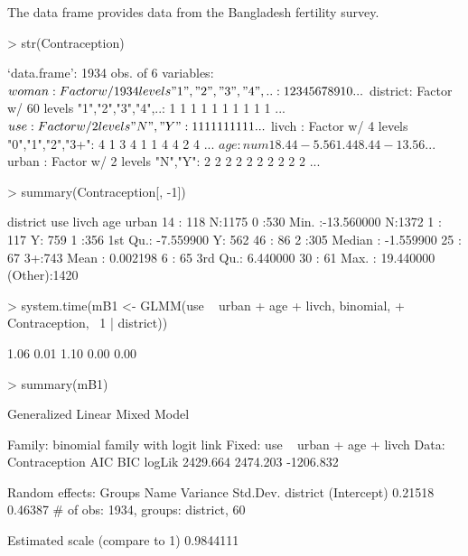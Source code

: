 \documentclass[12pt]{article}
\begin{document}
The data frame  provides data from the
Bangladesh fertility survey.
\begin{Schunk}
\begin{Sinput}
> str(Contraception)
\end{Sinput}
\begin{Soutput}
`data.frame':	1934 obs. of  6 variables:
 $ woman   : Factor w/ 1934 levels "1","2","3","4",..: 1 2 3 4 5 6 7 8 9 10 ...
 $ district: Factor w/ 60 levels "1","2","3","4",..: 1 1 1 1 1 1 1 1 1 1 ...
 $ use     : Factor w/ 2 levels "N","Y": 1 1 1 1 1 1 1 1 1 1 ...
 $ livch   : Factor w/ 4 levels "0","1","2","3+": 4 1 3 4 1 1 4 4 2 4 ...
 $ age     : num   18.44  -5.56   1.44   8.44 -13.56 ...
 $ urban   : Factor w/ 2 levels "N","Y": 2 2 2 2 2 2 2 2 2 2 ...
\end{Soutput}
\begin{Sinput}
> summary(Contraception[, -1])
\end{Sinput}
\begin{Soutput}
    district    use      livch         age             urban   
 14     : 118   N:1175   0 :530   Min.   :-13.560000   N:1372  
 1      : 117   Y: 759   1 :356   1st Qu.: -7.559900   Y: 562  
 46     :  86            2 :305   Median : -1.559900           
 25     :  67            3+:743   Mean   :  0.002198           
 6      :  65                     3rd Qu.:  6.440000           
 30     :  61                     Max.   : 19.440000           
 (Other):1420                                                  
\end{Soutput}
\begin{Sinput}
> system.time(mB1 <- GLMM(use ~ urban + age + livch, binomial, 
+     Contraception, ~1 | district))
\end{Sinput}
\begin{Soutput}
[1] 1.06 0.01 1.10 0.00 0.00
\end{Soutput}
\begin{Sinput}
> summary(mB1)
\end{Sinput}
\begin{Soutput}
Generalized Linear Mixed Model

Family: binomial family with logit link
Fixed: use ~ urban + age + livch 
Data: Contraception 
      AIC      BIC    logLik
 2429.664 2474.203 -1206.832

Random effects:
     Groups        Name    Variance    Std.Dev. 
   district (Intercept)     0.21518     0.46387 
# of obs: 1934, groups: district, 60

Estimated scale (compare to 1)  0.9844111 


\end{Soutput}
\end{Schunk}
\end{document}
